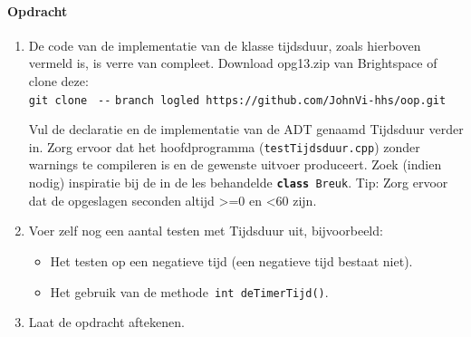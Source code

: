 \paragraph{Opdracht}
\begin{enumerate}[label=\alph*]
	\item De code van de implementatie van de klasse tijdsduur, zoals hierboven vermeld is, is verre van compleet.
	Download  opg13.zip van Brightspace of clone deze:\\ 
	{\small \texttt{git clone } \verb|--| \texttt{branch logled https://github.com/JohnVi-hhs/oop.git}}
	
	Vul de declaratie en de implementatie van de ADT genaamd  Tijdsduur verder in. Zorg ervoor dat het hoofdprogramma (\texttt{testTijdsduur.cpp}) zonder warnings te compileren is en de gewenste uitvoer produceert. Zoek (indien nodig) inspiratie bij de in de les behandelde \texttt{\textbf{class} Breuk}. Tip: Zorg ervoor dat de opgeslagen seconden altijd \textgreater =0 en \textless 60 zijn.
	\item Voer zelf nog een aantal testen met Tijdsduur uit, bijvoorbeeld:
	\begin{itemize}
		\item Het testen op een negatieve tijd (een negatieve tijd bestaat niet).
		\item Het gebruik van de methode\texttt{ int deTimerTijd()}.
	\end{itemize} 
	\item Laat de opdracht aftekenen.
\end{enumerate}
